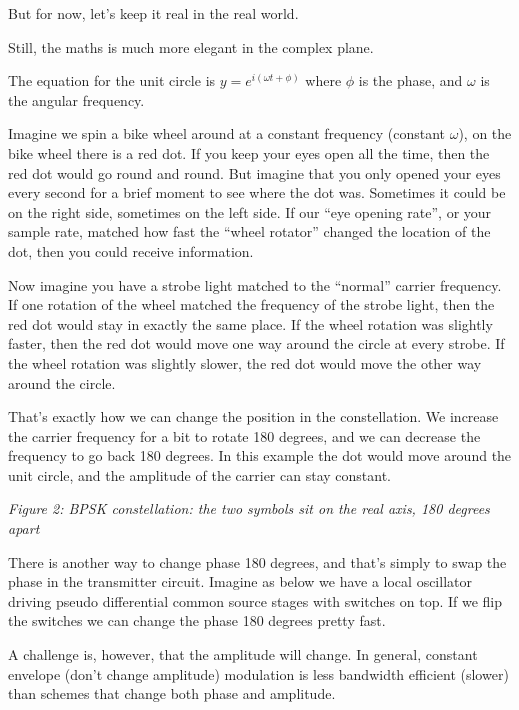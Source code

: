 But for now, let's keep it real in the real world.

Still, the maths is much more elegant in the complex plane.

The equation for the unit circle is \(y = e^{i( \omega t + \phi)}\)
where \(\phi\) is the phase, and \(\omega\) is the angular frequency.

Imagine we spin a bike wheel around at a constant frequency (constant
\(\omega\)), on the bike wheel there is a red dot. If you keep your eyes
open all the time, then the red dot would go round and round. But
imagine that you only opened your eyes every second for a brief moment
to see where the dot was. Sometimes it could be on the right side,
sometimes on the left side. If our ``eye opening rate'', or your sample
rate, matched how fast the ``wheel rotator'' changed the location of the
dot, then you could receive information.

Now imagine you have a strobe light matched to the ``normal'' carrier
frequency. If one rotation of the wheel matched the frequency of the
strobe light, then the red dot would stay in exactly the same place. If
the wheel rotation was slightly faster, then the red dot would move one
way around the circle at every strobe. If the wheel rotation was
slightly slower, the red dot would move the other way around the circle.

That's exactly how we can change the position in the constellation. We
increase the carrier frequency for a bit to rotate 180 degrees, and we
can decrease the frequency to go back 180 degrees. In this example the
dot would move around the unit circle, and the amplitude of the carrier
can stay constant.


{
\centering
{}
}

\emph{Figure 2: BPSK constellation: the two symbols sit on the real
axis, 180 degrees apart}

There is another way to change phase 180 degrees, and that's simply to
swap the phase in the transmitter circuit. Imagine as below we have a
local oscillator driving pseudo differential common source stages with
switches on top. If we flip the switches we can change the phase 180
degrees pretty fast.

A challenge is, however, that the amplitude will change. In general,
constant envelope (don't change amplitude) modulation is less bandwidth
efficient (slower) than schemes that change both phase and amplitude.


{
\centering
{}
}


